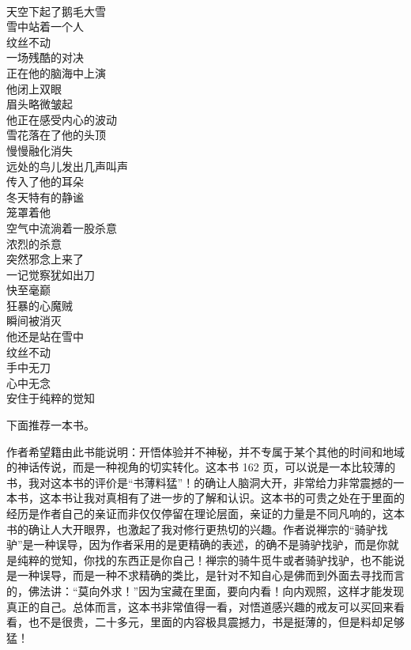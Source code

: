 \begin{poem}[壮哉杀念者]
    \begin{multicols}{3}
        \centering~\\
        天空下起了鹅毛大雪 \\ 雪中站着一个人 \\ 纹丝不动 \\ 一场残酷的对决 \\ 正在他的脑海中上演 \\ 他闭上双眼 \\ 眉头略微皱起 \\ 他正在感受内心的波动 \\ 雪花落在了他的头顶 \\ 慢慢融化消失 \\ 远处的鸟儿发出几声叫声 \\ 传入了他的耳朵 \\ 冬天特有的静谧 \\ 笼罩着他 \\ 空气中流淌着一股杀意 \\ 浓烈的杀意 \\ 突然邪念上来了 \\ 一记觉察犹如出刀 \\ 快至毫巅 \\ 狂暴的心魔贼 \\ 瞬间被消灭 \\ 他还是站在雪中 \\ 纹丝不动 \\ 手中无刀 \\ 心中无念 \\ 安住于纯粹的觉知
    \end{multicols}
\end{poem}

下面推荐一本书。

\begin{book}
    作者希望籍由此书能说明：开悟体验并不神秘，并不专属于某个其他的时间和地域的神话传说，而是一种视角的切实转化。这本书 162 页，可以说是一本比较薄的书，我对这本书的评价是“书薄料猛”！的确让人脑洞大开，非常给力非常震撼的一本书，这本书让我对真相有了进一步的了解和认识。这本书的可贵之处在于里面的经历是作者自己的亲证而非仅仅停留在理论层面，亲证的力量是不同凡响的，这本书的确让人大开眼界，也激起了我对修行更热切的兴趣。作者说禅宗的“骑驴找驴”是一种误导，因为作者采用的是更精确的表述，的确不是骑驴找驴，而是你就是纯粹的觉知，你找的东西正是你自己！禅宗的骑牛觅牛或者骑驴找驴，也不能说是一种误导，而是一种不求精确的类比，是针对不知自心是佛而到外面去寻找而言的，佛法讲：“莫向外求！”因为宝藏在里面，要向内看！向内观照，这样才能发现真正的自己。总体而言，这本书非常值得一看，对悟道感兴趣的戒友可以买回来看看，也不是很贵，二十多元，里面的内容极具震撼力，书是挺薄的，但是料却足够猛！
\end{book}

